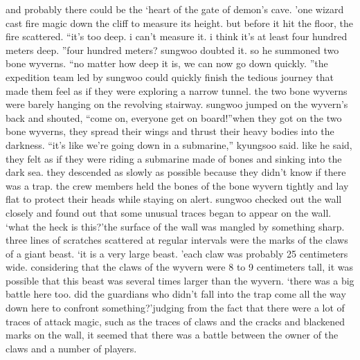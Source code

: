  and probably there could be the ‘heart of the gate of demon’s cave.
’one wizard cast fire magic down the cliff to measure its height.
 but before it hit the floor, the fire scattered.
“it’s too deep.
 i can’t measure it.
 i think it’s at least four hundred meters deep.
”four hundred meters? sungwoo doubted it.
 so he summoned two bone wyverns.
“no matter how deep it is, we can now go down quickly.
”the expedition team led by sungwoo could quickly finish the tedious journey that made them feel as if they were exploring a narrow tunnel.
the two bone wyverns were barely hanging on the revolving stairway.
sungwoo jumped on the wyvern’s back and shouted, “come on, everyone get on board!”when they got on the two bone wyverns, they spread their wings and thrust their heavy bodies into the darkness.
“it’s like we’re going down in a submarine,” kyungsoo said.
like he said, they felt as if they were riding a submarine made of bones and sinking into the dark sea.
they descended as slowly as possible because they didn’t know if there was a trap.
the crew members held the bones of the bone wyvern tightly and lay flat to protect their heads while staying on alert.
sungwoo checked out the wall closely and found out that some unusual traces began to appear on the wall.
‘what the heck is this?’the surface of the wall was mangled by something sharp.
 three lines of scratches scattered at regular intervals were the marks of the claws of a giant beast.
‘it is a very large beast.
’each claw was probably 25 centimeters wide.
 considering that the claws of the wyvern were 8 to 9 centimeters tall, it was possible that this beast was several times larger than the wyvern.
‘there was a big battle here too.
 did the guardians who didn’t fall into the trap come all the way down here to confront something?’judging from the fact that there were a lot of traces of attack magic, such as the traces of claws and the cracks and blackened marks on the wall, it seemed that there was a battle between the owner of the claws and a number of players.



